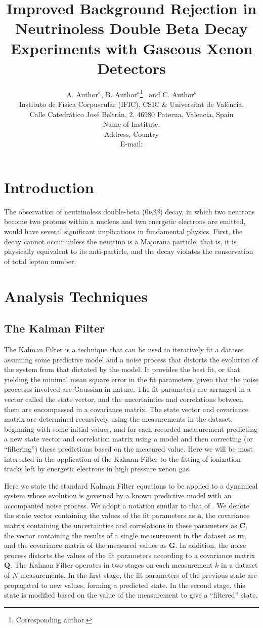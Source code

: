 \documentclass{JINST}
\title{Improved Background Rejection in Neutrinoless Double Beta Decay Experiments with Gaseous Xenon Detectors}
\author{A. Author$^a$,
B. Author$^a$\thanks{Corresponding author.}~
and C. Author$^b$\\
\llap{$^a$}Instituto de F\'isica Corpuscular (IFIC), CSIC \& Universitat de Val\`encia,\\ 
Calle Catedr\'atico Jos\'e Beltr\'an, 2, 46980 Paterna, Valencia, Spain\\
\llap{$^b$}Name of Institute,\\
  Address, Country\\
E-mail: \email{CorrespondingAuthor@email.com}}
\begin{document}
\section{Introduction}\label{sec:intro}
The observation of neutrinoless double-beta ($0\nu\beta\beta$) decay, in which two neutrons become two protons within a nucleus and two energetic electrons are emitted, would have several significant implications in fundamental physics.  First, the decay cannot occur unless the neutrino is a Majorana particle, that is, it is physically equivalent to its anti-particle, and the decay violates the conservation of total lepton number.

\section{Analysis Techniques}\label{sec:trackanalysis}

\subsection{The Kalman Filter}\label{ssec:kf}
\noindent The Kalman Filter is a technique that can be used to iteratively fit a dataset assuming some predictive model and a noise process that distorts the evolution of the system from that dictated by the model.  It provides the best fit, or that yielding the minimal mean square error in the fit parameters, given that the noise processes involved are Gaussian in nature.  The fit parameters are arranged in a vector called the state vector, and the uncertainties and correlations between them are encompassed in a covariance matrix.  The state vector and covariance matrix are determined recursively using the measurements in the dataset, beginning with some initial values, and for each recorded measurement predicting a new state vector and correlation matrix using a model and then correcting (or ``filtering'') these predictions based on the measured value.  Here we will be most interested in the application of the Kalman Filter to the fitting of ionization tracks left by energetic electrons in high pressure xenon gas.

Here we state the standard Kalman Filter equations to be applied to a dynamical system whose evolution is governed by a known predictive model with an accompanied noise process.  We adopt a notation similar to that of \cite{Wolin_1993}.  We denote the state vector containing the values of the fit parameters as $\mathbf{a}$, the covariance matrix containing the uncertainties and correlations in these parameters as $\mathbf{C}$, the vector containing the results of a single measurement in the dataset as $\mathbf{m}$, and the covariance matrix of the measured values as $\mathbf{G}$.  In addition, the noise process distorts the values of the fit parameters according to a covariance matrix $\mathbf{Q}$.  The Kalman Filter operates in two stages on each measurement $k$ in a dataset of $N$ measurements.  In the first stage, the fit parameters of the previous state are propagated to new values, forming a predicted state.  In the second stage, this state is modified based on the value of the measurement to give a ``filtered'' state.
\end{document}
